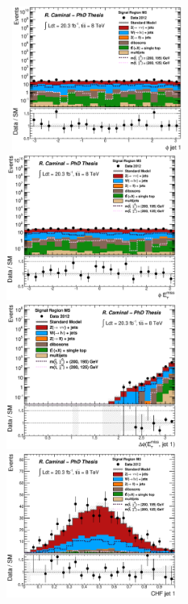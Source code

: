 \begin{figure}[!ht]
  \begin{center}
    \mbox{
      \includegraphics[width=0.495\textwidth]{MonojetAnalysis/Figures/plot_Stop_A9_SR_phi1_fitted.eps}
      \includegraphics[width=0.495\textwidth]{MonojetAnalysis/Figures/plot_Stop_A9_SR_met_phi_fitted.eps}
    }
    \mbox{
      \includegraphics[width=0.495\textwidth]{MonojetAnalysis/Figures/plot_Stop_A9_SR_dPhi_met_j1_fitted.eps}
      \includegraphics[width=0.495\textwidth]{MonojetAnalysis/Figures/plot_Stop_A9_SR_j1_chf_fitted.eps}
}
\end{center}
\end{figure}
